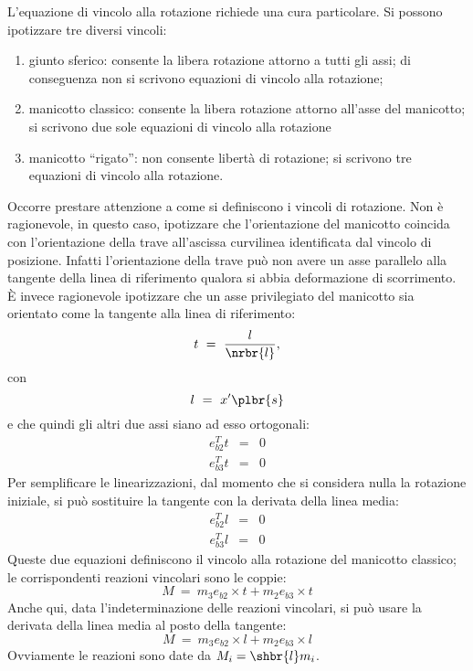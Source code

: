 \documentclass[12pt,dvips,fleqn,italian]{article}
\begin{document}
\noindent
L'equazione di vincolo alla rotazione richiede una cura particolare.
Si possono ipotizzare tre diversi vincoli:
\begin{enumerate}
	\item giunto sferico: consente la libera rotazione attorno a tutti
	gli assi; di conseguenza non si scrivono equazioni di vincolo
	alla rotazione;
	\item manicotto classico: consente la libera rotazione attorno
	all'asse del manicotto; si scrivono due sole equazioni di vincolo
	alla rotazione
	\item manicotto ``rigato'': non consente libert\`a di rotazione;
	si scrivono tre equazioni di vincolo alla rotazione.
\end{enumerate}
Occorre prestare attenzione a come si definiscono i vincoli di rotazione.
Non \`e ragionevole, in questo caso, ipotizzare che l'orientazione 
del manicotto coincida con l'orientazione della trave all'ascissa
curvilinea identificata dal vincolo di posizione.
Infatti l'orientazione della trave pu\`o non avere un asse parallelo
alla tangente della linea di riferimento qualora si abbia deformazione
di scorrimento.
\`E invece ragionevole ipotizzare che un asse privilegiato del manicotto
sia orientato come la tangente alla linea di riferimento:
\begin{displaymath}
	t \ = \ \frac{l}{\nrbr{l}} ,
\end{displaymath}
con 
\begin{displaymath}
	l \ = \ x'\plbr{s}
\end{displaymath}
e che quindi gli altri due assi siano ad esso ortogonali:
\begin{eqnarray*}
	e_{b2}^T t & = & 0 \\
	e_{b3}^T t & = & 0
\end{eqnarray*}
Per semplificare le linearizzazioni, dal momento che si considera nulla
la rotazione iniziale, si pu\`o sostituire la tangente
con la derivata della linea media:
\begin{eqnarray*}
	e_{b2}^T l & = & 0 \\
	e_{b3}^T l & = & 0
\end{eqnarray*}
Queste due equazioni definiscono il vincolo alla rotazione del manicotto 
classico; le corrispondenti reazioni vincolari sono le coppie:
\begin{displaymath}
	M \ = \ m_3 e_{b2}\times{t} + m_2 e_{b3}\times{t}
\end{displaymath}
Anche qui, data l'indeterminazione delle reazioni vincolari, si pu\`o 
usare la derivata della linea media al posto della tangente:
\begin{displaymath}
	M \ = \ m_3 e_{b2}\times{l} + m_2 e_{b3}\times{l}
\end{displaymath}
Ovviamente le reazioni sono date da $M_i=\shbr{l}m_i$.
\end{document}
